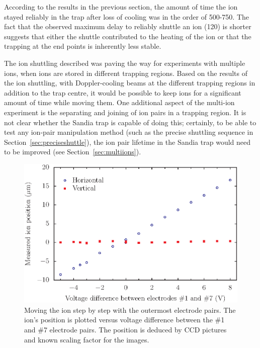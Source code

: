 According to the results in the previous section, the amount of time the ion stayed reliably in the trap after loss of cooling was in the order of 500-750\ms. The fact that the observed maximum delay to reliably shuttle an ion (120\ms) is shorter suggests that either the shuttle contributed to the heating of the ion or that the trapping at the end points is inherently less stable.

The ion shuttling described was paving the way for experiments with multiple ions, when ions are stored in different trapping regions. Based on the results of the ion shuttling, with Doppler-cooling beams at the different trapping regions in addition to the trap centre, it would be possible to keep ions for a significant amount of time while moving them. One additional aspect of the multi-ion experiment is the separating and joining of ion pairs in a trapping region. It is not clear whether the Sandia trap is capable of doing this; certainly, to be able to test any ion-pair manipulation method (such as the precise shuttling sequence in Section~\ref{sec:preciseshuttle}), the ion pair lifetime in the Sandia trap would need to be improved (see Section~\ref{sec:multiions}).

\begin{figure}[h!t]
\centering
\includegraphics[width=14.5cm]{chapter7/ionmove/ionmove_v1}
\caption[Moving ion step by step with outermost electrode pairs]{Moving the ion step by step with the outermost electrode pairs. The ion's position is plotted versus voltage difference between the \#1 and \#7 electrode pairs. The position is deduced by CCD pictures and known scaling factor for the images.}
\label{fig:stepmove}
\end{figure} 


